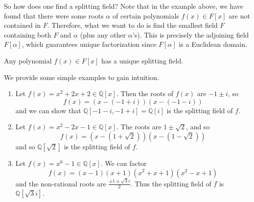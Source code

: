   So how does one find a splitting field? Note that in the example above, we have found that there were some roots $\alpha$ of certain polynomials $f(x) \in F[x]$ are not contained in $F$. Therefore, what we want to do is find the smallest field $F$ containing both $F$ and $\alpha$ (plus any other $\alpha$'s). This is precisely the adjoining field $F[\alpha]$, which guarantees unique factorization since $F[\alpha]$ is a Euclidean domain. 

  \begin{corollary}
    Any polynomial $f(x) \in F[x]$ has a unique splitting field. 
  \end{corollary}

  \begin{example}
    We provide some simple examples to gain intuition. 
    \begin{enumerate}
      \item Let $f(x) = x^2 + 2x + 2 \in \mathbb{Q}[x]$. Then the roots of $f(x)$ are $-1 \pm i$, so 
      \begin{equation}
        f(x) = (x - (-1 + i)) (x - (-1 - i)) 
      \end{equation}
      and we can show that $\mathbb{Q}[-1 - i, -1+i] = \mathbb{Q}[i]$ is the splitting field of $f$. 

      \item Let $f(x) = x^2 - 2x - 1 \in \mathbb{Q}[x]$. The roots are $1 \pm \sqrt{2}$, and so 
      \begin{equation}
        f(x) = (x - (1 + \sqrt{2})) (x - (1 - \sqrt{2}))
      \end{equation}
      and so $\mathbb{Q}[\sqrt{2}]$ is the splitting field of $f$. 

      \item Let $f(x) = x^6 - 1 \in \mathbb{Q}[x]$. We can factor 
        \begin{equation}
          f(x) = (x-1) (x + 1) (x^2 + x + 1) (x^2 - x + 1)
        \end{equation} 
        and the non-rational roots are $\frac{\pm 1 \pm \sqrt{3} i}{2}$. Thus the splitting field of $f$ is $\mathbb{Q}[\sqrt{3} i]$. 
    \end{enumerate}
  \end{example}

